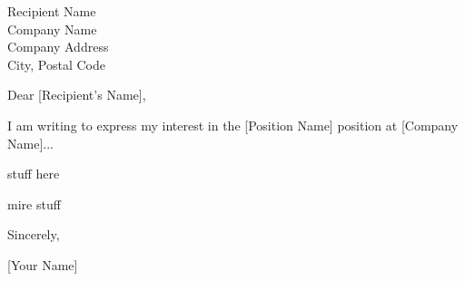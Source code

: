\documentclass[a4paper,10pt]{letter}
\begin{document}
\begin{letter}{Recipient Name \\
Company Name \\
Company Address \\
City, Postal Code}

\opening{Dear [Recipient's Name],}

I am writing to express my interest in the [Position Name] position at [Company Name]...

stuff here

mire stuff


\closing{Sincerely,}
\vspace{1em}
[Your Name]

\end{letter}
\end{document}
